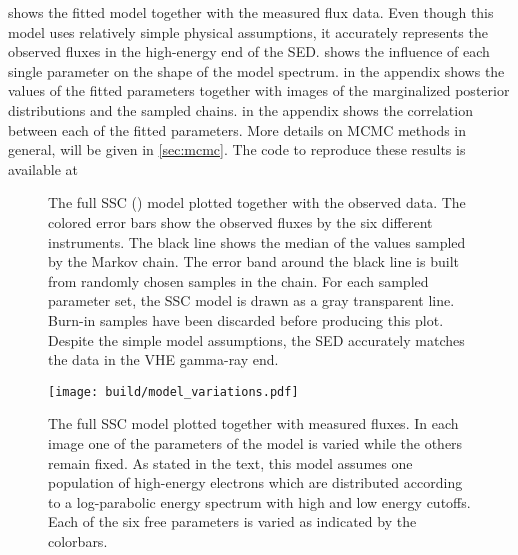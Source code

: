  shows the fitted model together with the measured flux data. 
Even though this model uses relatively simple physical assumptions, it accurately represents the observed fluxes in the high-energy end of the SED.
 shows the influence of each single parameter on the shape of the model spectrum.
 in the appendix shows the values of the fitted parameters together with 
images of the marginalized posterior distributions and the sampled chains.
 in the appendix shows the correlation between each of the fitted parameters.
More details on MCMC methods in general, will be given in \cref{sec:mcmc}.
The code to reproduce these results is available at 
\begin{figure}
  \centering
  
  \caption[Fit of SSC model to Crab Nebula data]{The full SSC (\ssclong) model plotted together with the observed data.
  The colored error bars show the observed fluxes by the six different instruments.
  The black line shows the median of the values sampled by the Markov chain. The error band around the black line is built from randomly chosen samples in the chain. 
  For each sampled parameter set, the SSC model is drawn as a gray transparent line. 
  Burn-in samples have been discarded before producing this plot. Despite the 
  simple model assumptions, the SED accurately matches the data in the VHE gamma-ray end.}
  \label{fig:ssc_fit}
\end{figure}

\begin{figure}[p]
  \centering
  \texttt{[image: build/model\_variations.pdf]}
  \caption[SSC model with varying parameters]{The full SSC model plotted together with measured fluxes. In each image one of the parameters 
  of the model is varied while the others remain fixed. As stated in the text, this model assumes one population of high-energy electrons 
  which are distributed according to a log-parabolic energy spectrum with high and low energy cutoffs. Each of the six 
  free parameters is varied as indicated by the colorbars.}
  \label{fig:model_variations}
\end{figure}


